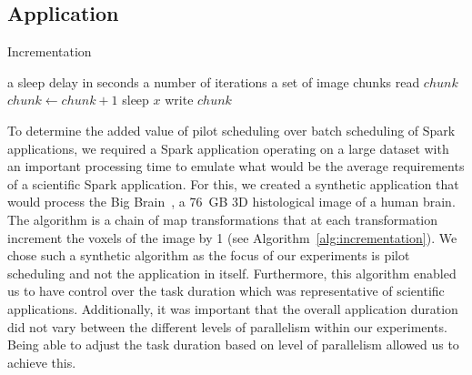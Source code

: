 \documentclass{IEEEtran}
\newcommand{\Desc}[2]{\State \makebox[2em][l]{#1}#2}
\begin{document}
    \subsection{Application}
        \begin{algorithm}\caption{Incrementation}\label{alg:incrementation}              
            \begin{algorithmic}[1]                                                       
                \Input                                                                       
                    \Desc{$x$}{a sleep delay in seconds}                                         
                    \Desc{$n$}{a number of iterations}                                           
                    \Desc{$C$}{a set of image chunks}                                            
                \EndInput                                                                    
                    \State read $chunk$                                        
                        \State $chunk\gets chunk+1$                                              
                        \State sleep $x$                               
                    \EndFor                                                                      
                    \State write $chunk$                                            
                \EndFor                                                                      
            \end{algorithmic}                                                                
        \end{algorithm}
    To determine the added value of pilot scheduling over batch scheduling of Spark
    applications, we required a Spark application operating on a large dataset with
    an important processing time to emulate what would be the average requirements
    of a scientific Spark application. For this, we created a synthetic application 
    that would process the Big Brain~\cite{amunts2013bigbrain}, a 76~GB 3D histological
    image of a human brain. The algorithm is a chain of map transformations that
    at each transformation increment the voxels of the image by 1 (see Algorithm~\ref{alg:incrementation}).
    We chose such a synthetic algorithm
    as the focus of our experiments is pilot scheduling and not the application in
    itself. Furthermore, this algorithm enabled us to have control over the task duration
    which was representative of scientific applications. Additionally, it was important
    that the overall application duration did not vary between the different levels of
    parallelism within our experiments. Being able to adjust the task duration based on
    level of parallelism allowed us to achieve this.
\end{document}
